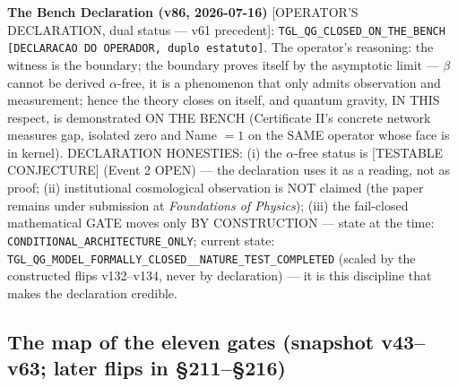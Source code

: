 \documentclass[11pt]{article}
\theoremstyle{definition}\newtheorem{deriv}{Derivation}
\begin{document}
\textbf{The Bench Declaration (v86, 2026-07-16)} [OPERATOR'S DECLARATION, dual status --- v61 precedent]: \texttt{TGL\_QG\_CLOSED\_ON\_THE\_BENCH [DECLARACAO DO OPERADOR, duplo estatuto]}. The operator's reasoning: the witness is the boundary; the boundary proves itself by the asymptotic limit --- $\beta$ cannot be derived $\alpha$-free, it is a phenomenon that only admits observation and measurement; hence the theory closes on itself, and quantum gravity, IN THIS respect, is demonstrated ON THE BENCH (Certificate II's concrete network measures gap, isolated zero and Name $=1$ on the SAME operator whose face is in kernel). DECLARATION HONESTIES: (i) the $\alpha$-free status is [TESTABLE CONJECTURE] (Event 2 OPEN) --- the declaration uses it as a reading, not as proof; (ii) institutional cosmological observation is NOT claimed (the paper remains under submission at \emph{Foundations of Physics}); (iii) the fail-closed mathematical GATE moves only BY CONSTRUCTION --- state at the time: \texttt{CONDITIONAL\_ARCHITECTURE\_ONLY}; current state: \texttt{TGL\_QG\_MODEL\_FORMALLY\_CLOSED\_\_NATURE\_TEST\_COMPLETED} (scaled by the constructed flips v132--v134, never by declaration) --- it is this discipline that makes the declaration credible.

\subsection*{The map of the eleven gates (snapshot v43--v63; later flips in \S211--\S216)}
\end{document}
